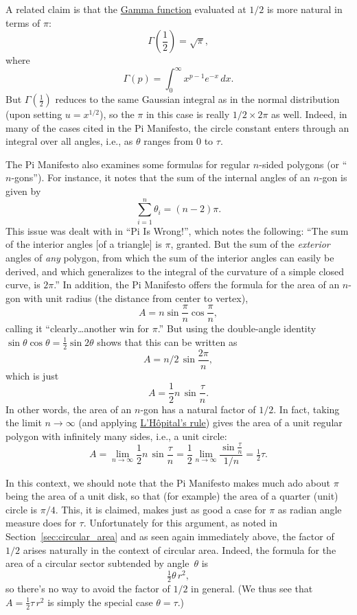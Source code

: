 A related claim is that the \href{http://mathworld.wolfram.com/GammaFunction.html}{Gamma function} evaluated at $1/2$ is more natural in terms of $\pi$:
\[
\Gamma(\textstyle{\frac{1}{2}}) = \sqrt{\pi},
\]
where
\[
\Gamma(p) = \int_{0}^{\infty} x^{p-1} e^{-x}\,dx.
\]
But $\Gamma(\frac{1}{2})$ reduces to the same Gaussian integral as in the normal distribution (upon setting $u =
x^{1/2}$), so the $\pi$ in this case is really $1/2\times 2\pi$ as well. Indeed, in many of the cases cited in the Pi Manifesto,
the circle constant enters through an integral over all angles, i.e.,
as $\theta$ ranges from $0$ to $\tau$.

The Pi Manifesto also examines some formulas for regular
$n$-sided polygons (or ``$n$-gons''). For instance, it notes that the sum of the internal angles of an $n$-gon is given by
\[
\sum_{i=1}^n \theta_i=(n-2)\pi.
\]
This issue was dealt with in ``Pi Is Wrong!'', which notes the following: ``The sum of the interior angles [of a
triangle] is $\pi$, granted. But the sum of the \emph{exterior} angles of \emph{any}
polygon, from which the sum of the interior angles can easily be
derived, and which generalizes to the integral of the curvature of a
simple closed curve, is $2\pi$.'' In addition, the Pi Manifesto offers the formula for the area of an $n$-gon with unit radius (the distance from center to vertex),
\[ A=n\sin\frac{\pi}{n}\cos\frac{\pi}{n}, \]
calling it ``clearly\ldots another win for $\pi$.'' But using the double-angle identity $\sin\theta\cos\theta = \frac{1}{2} \sin 2\theta$ shows that this can be written as
\[ A = n/2\, \sin\frac{2\pi}{n}, \]
which is just
\[ A = \frac{1}{2} n\, \sin\frac{\tau}{n}. \]
In other words, the area of an $n$-gon has a natural
factor of $1/2$. In fact, taking the limit $n\rightarrow \infty$ (and applying \href{http://mathworld.wolfram.com/LHospitalsRule.html}{L'H\^{o}pital's rule}) gives the area of a unit regular polygon with infinitely many sides, i.e., a unit circle:
\[
A = \lim_{n\rightarrow\infty} \frac{1}{2} n\, \sin\frac{\tau}{n}
= \frac{1}{2} \lim_{n\rightarrow\infty} \frac{\sin\frac{\tau}{n}}{1/n} = \tfrac{1}{2}\tau.
\]

In this context, we should note that the Pi Manifesto makes much ado about $\pi$ being the area of a unit disk, so that (for example) the area of a quarter (unit) circle is $\pi/4$. This, it is claimed, makes just as good a case for $\pi$ as radian angle measure does for $\tau$. Unfortunately for this argument, as noted in Section~\ref{sec:circular_area} and as seen again immediately above, the factor of $1/2$ arises naturally in the context of circular area. Indeed, the formula for the area of a circular sector subtended by angle~$\theta$ is
\[
\tfrac{1}{2}\theta\, r^2,
\]
so there's no way to avoid the factor of $1/2$ in general. (We thus see that $A =
\frac{1}{2} \tau\, r^2$ is simply the special case $\theta = \tau$.)

